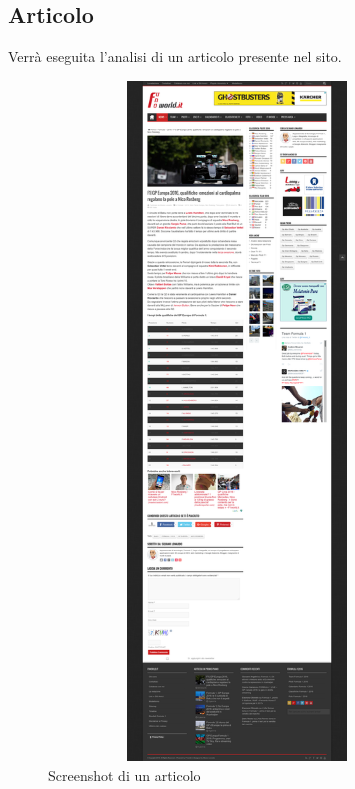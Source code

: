 \subsection{Articolo}
Verr\`a eseguita l'analisi di un articolo presente nel sito.

\begin{figure}[h] %
  \centering
  \includegraphics[height=18cm, width=10cm]{res/img/Article}
  \caption{Screenshot di un articolo}
\end{figure}
